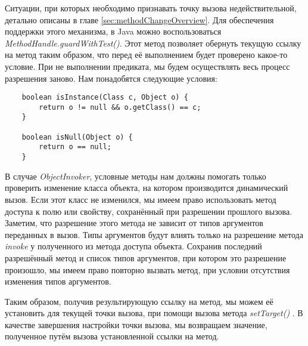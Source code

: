 Ситуации, при которых необходимо признавать точку вызова недействительной, детально описаны в главе \ref{sec:methodChangeOverview}. Для обеспечения поддержки этого механизма, в Java можно воспользоваться \textit{MethodHandle.guardWithTest()}. Этот метод позволяет обернуть текущую ссылку на метод таким образом, что перед её выполнением будет проверено какое-то условие. При не выполнении предиката, мы будем осуществлять весь процесс разрешения заново. Нам понадобятся следующие условия:

\begin{verbatim}
    boolean isInstance(Class c, Object o) {
        return o != null && o.getClass() == c;
    }

    boolean isNull(Object o) {
        return o == null;
    }
\end{verbatim} 

В случае \textit{ObjectInvoker}, условные методы нам должны помогать только проверить изменение класса объекта, на котором производится динамический вызов. Если этот класс не изменился, мы имеем право использовать метод доступа к полю или свойству, сохранённый при разрешении прошлого вызова. Заметим, что разрешение этого метода не зависит от типов аргументов переданных в вызов. Типы аргументов будут влиять только на разрешение метода \textit{invoke} у полученного из метода доступа объекта. Сохранив последний разрешённый метод и список типов аргументов, при котором это разрешение произошло, мы имеем право повторно вызвать метод, при условии отсутствия изменения типов аргументов.

Таким образом, получив результирующую ссылку на метод, мы можем её установить для текущей точки вызова, при помощи вызова метода 	\textit{setTarget()} \cite{javadoc:MutableCallSite}. В качестве завершения настройки точки вызова, мы возвращаем значение, полученное путём вызова установленной ссылки на метод.